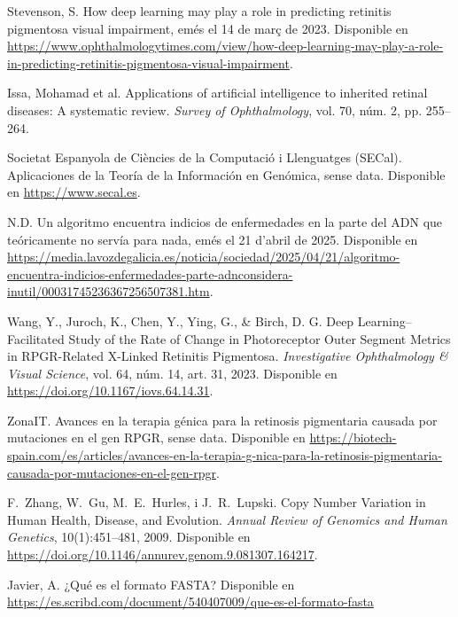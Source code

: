 \documentclass[11pt,spanish,listoffigures,listoftables]{tfgetsinf}
\begin{document}
\begin{thebibliography}{99}
   Stevenson, S.  
   \newblock How deep learning may play a role in predicting retinitis pigmentosa visual impairment,  
   emés el 14 de març de 2023.  
   \newblock Disponible en  
   \url{https://www.ophthalmologytimes.com/view/how-deep-learning-may-play-a-role-in-predicting-retinitis-pigmentosa-visual-impairment}.

   Issa, Mohamad et al.  
   \newblock Applications of artificial intelligence to inherited retinal diseases: A systematic review.  
   \newblock \textit{Survey of Ophthalmology}, vol. 70, núm. 2, pp. 255--264.  

   Societat Espanyola de Ciències de la Computació i Llenguatges (SECal).  
   \newblock Aplicaciones de la Teoría de la Información en Genómica,  
   sense data.  
   \newblock Disponible en  
   \url{https://www.secal.es}.

   N.D.  
   \newblock Un algoritmo encuentra indicios de enfermedades en la parte del ADN que teóricamente no servía para nada,  
   emés el 21 d’abril de 2025.  
   \newblock Disponible en  
   \url{https://media.lavozdegalicia.es/noticia/sociedad/2025/04/21/algoritmo-encuentra-indicios-enfermedades-parte-adnconsidera-inutil/00031745236367256507381.htm}.

   Wang, Y., Juroch, K., Chen, Y., Ying, G., \& Birch, D. G.  
   \newblock Deep Learning–Facilitated Study of the Rate of Change in Photoreceptor Outer Segment Metrics in RPGR-Related X-Linked Retinitis Pigmentosa.  
   \newblock \textit{Investigative Ophthalmology \& Visual Science}, vol. 64, núm. 14, art. 31, 2023.  
   \newblock Disponible en  
   \url{https://doi.org/10.1167/iovs.64.14.31}.

   ZonaIT.  
   \newblock Avances en la terapia génica para la retinosis pigmentaria causada por mutaciones en el gen RPGR,  
   sense data.  
   \newblock Disponible en  
   \url{https://biotech-spain.com/es/articles/avances-en-la-terapia-g-nica-para-la-retinosis-pigmentaria-causada-por-mutaciones-en-el-gen-rpgr}.

   F.~Zhang, W.~Gu, M.~E.~Hurles, i J.~R.~Lupski.
   \newblock Copy Number Variation in Human Health, Disease, and Evolution.
   \newblock \textit{Annual Review of Genomics and Human Genetics}, 10(1):451--481, 2009.
   \newblock Disponible en
   \newblock \url{https://doi.org/10.1146/annurev.genom.9.081307.164217}.
   
   Javier, A.  
   \newblock ¿Qué es el formato FASTA?    
   \newblock Disponible en 
   \newblock \url{https://es.scribd.com/document/540407009/que-es-el-formato-fasta}
 

\end{thebibliography}
\end{document}
